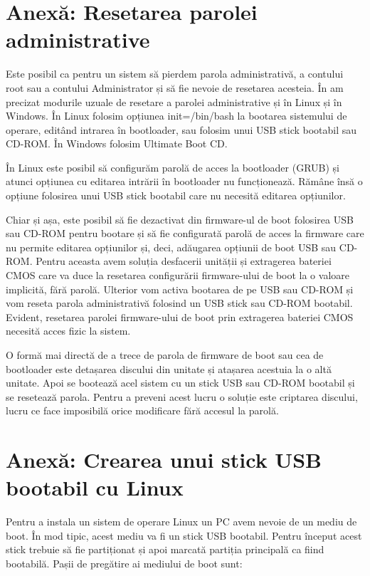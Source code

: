 \section{Anexă: Resetarea parolei administrative}
\label{sec:boot-passreset}

Este posibil ca pentru un sistem să pierdem parola administrativă, a contului
root sau a contului Administrator și să fie nevoie de resetarea acesteia. În
 am precizat modurile
uzuale de resetare a parolei administrative și în Linux și în Windows. În Linux
folosim opțiunea init=/bin/bash la bootarea sistemului de operare, editând
intrarea în bootloader, sau folosim unui USB stick bootabil sau CD-ROM. În
Windows folosim Ultimate Boot CD.

În Linux este posibil să configurăm parolă de acces la bootloader (GRUB) și
atunci opțiunea cu editarea intrării în bootloader nu funcționează. Rămâne însă
o opțiune folosirea unui USB stick bootabil care nu necesită editarea
opțiunilor.

Chiar și așa, este posibil să fie dezactivat din firmware-ul de boot folosirea
USB sau CD-ROM pentru bootare și să fie configurată parolă de acces la firmware
care nu permite editarea opțiunilor și, deci, adăugarea opțiunii de boot USB sau
CD-ROM. Pentru aceasta avem soluția desfacerii unității și extragerea bateriei
CMOS care va duce la resetarea configurării firmware-ului de boot la o valoare
implicită, fără parolă. Ulterior vom activa bootarea de pe USB sau CD-ROM și vom
reseta parola administrativă folosind un USB stick sau CD-ROM bootabil. Evident,
resetarea parolei firmware-ului de boot prin extragerea bateriei CMOS necesită
acces fizic la sistem.

O formă mai directă de a trece de parola de firmware de boot sau cea de
bootloader este detașarea discului din unitate și atașarea acestuia la o altă
unitate. Apoi se bootează acel sistem cu un stick USB sau CD-ROM bootabil și se
resetează parola. Pentru a preveni acest lucru o soluție este criptarea
discului, lucru ce face imposibilă orice modificare fără accesul la parolă.

\section{Anexă: Crearea unui stick USB bootabil cu Linux}
\label{sec:boot-usb}

Pentru a instala un sistem de operare Linux un PC avem nevoie de un mediu de
boot. În mod tipic, acest mediu va fi un stick USB bootabil. Pentru început
acest stick trebuie să fie partiționat și apoi marcată partiția principală ca
fiind bootabilă. Pașii de pregătire ai mediului de boot sunt:

